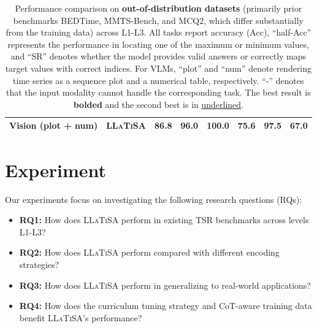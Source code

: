 \documentclass[11pt]{article}
\begin{document}
\begin{table}[tbp]
{\begin{tabular}{ll|ccc|cc|c}
\midrule
Vision (plot + num) & \textsc{LLaTiSA} & \textbf{86.8} & \textbf{96.0} & 100.0 & \textbf{75.6} & \textbf{97.5} & \textbf{67.0} \\
\bottomrule
\end{tabular}
}
\caption{Performance comparison on \textbf{out-of-distribution datasets} (primarily prior benchmarks BEDTime, MMTS-Bench, and MCQ2, which differ substantially from the training data) across L1-L3. All tasks report accuracy (Acc), ``half-Acc'' represents the performance in locating one of the maximum or minimum values, and ``SR'' denotes whether the model provides valid answers or correctly maps target values with correct indices. For VLMs, ``plot'' and ``num'' denote rendering time series as a sequence plot and a numerical table, respectively. ``-'' denotes that the input modality cannot handle the corresponding task. The best result is \textbf{bolded} and the second best is in \underline{underlined}.}
\label{tab:zeroshot}
\end{table}

\section{Experiment}
Our experiments focus on investigating the following research questions (RQs):
\begin{itemize}[left=0pt]
\setlength{\itemsep}{0.5pt}
\item\textbf{RQ1:} How does \textsc{LLaTiSA} perform in existing TSR benchmarks across levels L1-L3?
\item\textbf{RQ2:} How does \textsc{LLaTiSA} perform compared with different encoding strategies?
\item\textbf{RQ3:} How does \textsc{LLaTiSA} perform in generalizing to real-world applications?
\item\textbf{RQ4:} How does the curriculum tuning strategy and CoT-aware training data benefit \textsc{LLaTiSA}'s performance?
\end{itemize}
\end{document}

